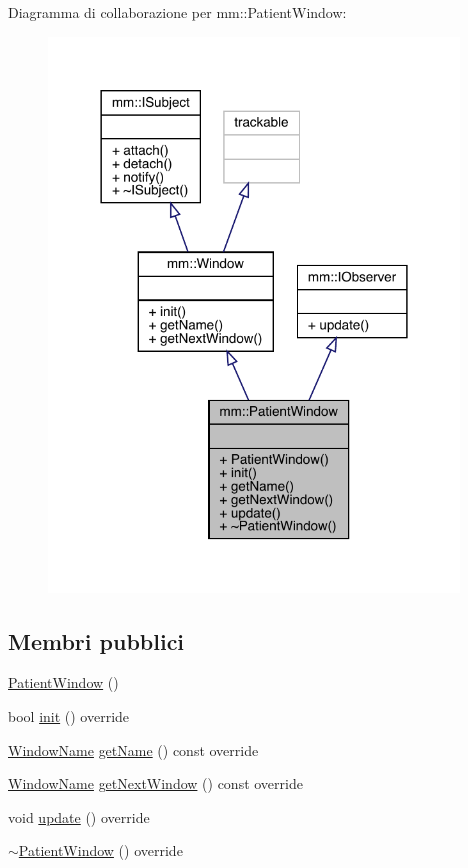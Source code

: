 Diagramma di collaborazione per mm\+:\+:Patient\+Window\+:\nopagebreak
\begin{figure}[H]
\begin{center}
\leavevmode
\includegraphics[width=309pt]{d2/da5/classmm_1_1_patient_window__coll__graph}
\end{center}
\end{figure}
\subsection*{Membri pubblici}
\begin{DoxyCompactItemize}
\item 
\hyperlink{classmm_1_1_patient_window_a303da04da191185a070454feff15e014}{Patient\+Window} ()
\item 
bool \hyperlink{classmm_1_1_patient_window_a0ad27245769b095559858eeecdbb7089}{init} () override
\item 
\hyperlink{namespacemm_a4e9d92e04f65dbf2fc1963947da0d93c}{Window\+Name} \hyperlink{classmm_1_1_patient_window_ab951ab5bf21df2b9450496c6faca5268}{get\+Name} () const override
\item 
\hyperlink{namespacemm_a4e9d92e04f65dbf2fc1963947da0d93c}{Window\+Name} \hyperlink{classmm_1_1_patient_window_ae22b9bce4c7ccdbcc45feb080088a558}{get\+Next\+Window} () const override
\item 
void \hyperlink{classmm_1_1_patient_window_a461de186f72a8902a9f95a622dc1c02b}{update} () override
\item 
\hyperlink{classmm_1_1_patient_window_a48de0e9302eb9cb9b33e8641f27f01c1}{$\sim$\+Patient\+Window} () override
\end{DoxyCompactItemize}



